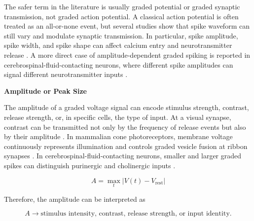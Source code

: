 \documentclass{book}
\providecommand{\ProjectDeepHeading}[2]{%
    \par\medskip\noindent\textbf{#2}\par\smallskip
}
\begin{document}
        The safer term in the literature is usually graded potential or graded synaptic transmission, not graded action potential. A classical action potential is often treated as an all-or-none event, but several studies show that spike waveform can still vary and modulate synaptic transmission. In particular, spike amplitude, spike width, and spike shape can affect calcium entry and neurotransmitter release \citep{zbili-2019-past-and-future-of-analog-digital-modulation-of-synaptic-transmission}. A more direct case of amplitude-dependent graded spiking is reported in cerebrospinal-fluid-contacting neurons, where different spike amplitudes can signal different neurotransmitter inputs \citep{johnson-2023-graded-spikes-differentially-signal-neurotransmitter-input-in-cerebrospinal-fluid-contacting-neurons-of-the-mouse-spinal-cord}.
        
        \ProjectDeepHeading{12}{Amplitude or Peak Size}
            
            The amplitude of a graded voltage signal can encode stimulus strength, contrast, release strength, or, in specific cells, the type of input. At a visual synapse, contrast can be transmitted not only by the frequency of release events but also by their amplitude \citep{james-2019-an-amplitude-code-transmits-information-at-a-visual-synapse}. In mammalian cone photoreceptors, membrane voltage continuously represents illumination and controls graded vesicle fusion at ribbon synapses \citep{grabner-2023-mechanisms-of-simultaneous-linear-and-nonlinear-computations-at-the-mammalian-cone-photoreceptor-synapse}. In cerebrospinal-fluid-contacting neurons, smaller and larger graded spikes can distinguish purinergic and cholinergic inputs \citep{johnson-2023-graded-spikes-differentially-signal-neurotransmitter-input-in-cerebrospinal-fluid-contacting-neurons-of-the-mouse-spinal-cord}.
            
            \begin{equation}
                A
                =
                \max_t |V(t)-V_{\mathrm{rest}}|
            \end{equation}
            
            Therefore, the amplitude can be interpreted as
            
            \begin{equation}
                A
                \rightarrow
                \text{stimulus intensity, contrast, release strength, or input identity}.
            \end{equation}
        
\end{document}
